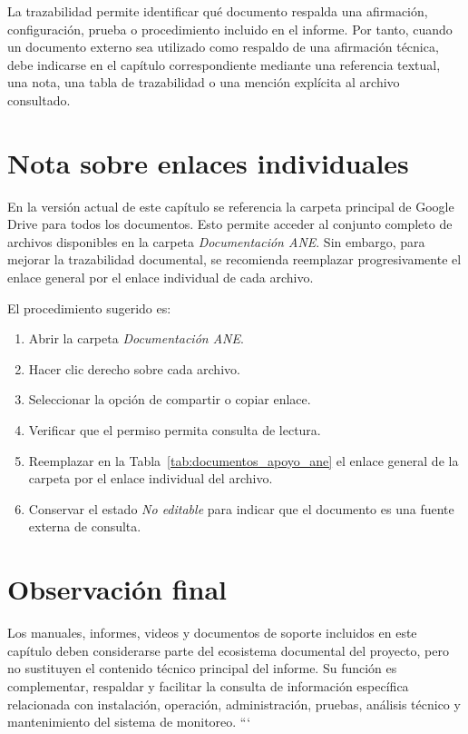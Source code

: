 La trazabilidad permite identificar qué documento respalda una afirmación, configuración, prueba o procedimiento incluido en el informe. Por tanto, cuando un documento externo sea utilizado como respaldo de una afirmación técnica, debe indicarse en el capítulo correspondiente mediante una referencia textual, una nota, una tabla de trazabilidad o una mención explícita al archivo consultado.

\section{Nota sobre enlaces individuales}

En la versión actual de este capítulo se referencia la carpeta principal de Google Drive para todos los documentos. Esto permite acceder al conjunto completo de archivos disponibles en la carpeta \textit{Documentación ANE}. Sin embargo, para mejorar la trazabilidad documental, se recomienda reemplazar progresivamente el enlace general por el enlace individual de cada archivo.

El procedimiento sugerido es:

\begin{enumerate}
    \item Abrir la carpeta \textit{Documentación ANE}.
    \item Hacer clic derecho sobre cada archivo.
    \item Seleccionar la opción de compartir o copiar enlace.
    \item Verificar que el permiso permita consulta de lectura.
    \item Reemplazar en la Tabla~\ref{tab:documentos_apoyo_ane} el enlace general de la carpeta por el enlace individual del archivo.
    \item Conservar el estado \textit{No editable} para indicar que el documento es una fuente externa de consulta.
\end{enumerate}

\section{Observación final}

Los manuales, informes, videos y documentos de soporte incluidos en este capítulo deben considerarse parte del ecosistema documental del proyecto, pero no sustituyen el contenido técnico principal del informe. Su función es complementar, respaldar y facilitar la consulta de información específica relacionada con instalación, operación, administración, pruebas, análisis técnico y mantenimiento del sistema de monitoreo.
```
